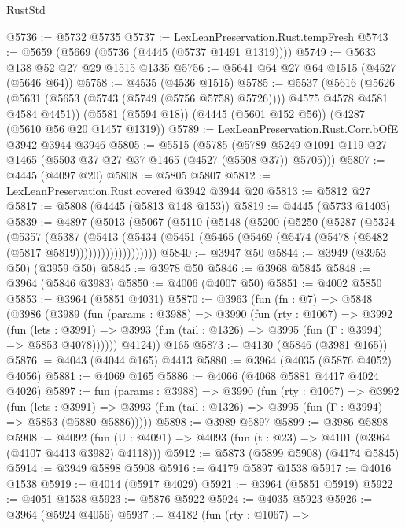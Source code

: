 \begin{lexlean}{RustStd}
\begin{coremodule}
{\begin{coremodule}
{{{{{{{{{{{{{{{{{{{{{{{{{{{{{{{{{{{{{{@5736 := @5732 @5735
@5737 := LexLeanPreservation.Rust.tempFresh
@5743 := @5659 (@5669 (@5736 (@4445 (@5737 @1491 @1319))))
@5749 := @5633 @138 @52 @27 @29 @1515 @1335
@5756 := @5641 @64 @27 @64 @1515 (@4527 (@5646 @64))
@5758 := @4535 (@4536 @1515)
@5785 := @5537
    (@5616
      (@5626 (@5631 (@5653 (@5743 (@5749 (@5756 @5758) @5726)))) @4575 @4578 @4581 @4584 @4451))
    (@5581 (@5594 @18))
    (@4445 (@5601 @152 @56))
    (@4287 (@5610 @56 @20 @1457 @1319))
@5789 := LexLeanPreservation.Rust.Corr.bOfE @3942 @3944 @3946
@5805 := @5515
    (@5785 (@5789 @5249 @1091 @119 @27 @1465 (@5503 @37 @27 @37 @1465 (@4527 (@5508 @37)) @5705)))
@5807 := @4445 (@4097 @20)
@5808 := @5805 @5807
@5812 := LexLeanPreservation.Rust.covered @3942 @3944 @20
@5813 := @5812 @27
@5817 := @5808 (@4445 (@5813 @148 @153))
@5819 := @4445 (@5733 @1403)
@5839 := @4897
    (@5013
      (@5067
        (@5110
          (@5148
            (@5200
              (@5250
                (@5287
                  (@5324
                    (@5357
                      (@5387
                        (@5413
                          (@5434
                            (@5451
                              (@5465 (@5469 (@5474 (@5478 (@5482 (@5817 @5819)))))))))))))))))))
@5840 := @3947 @50
@5844 := @3949 (@3953 @50) (@3959 @50)
@5845 := @3978 @50
@5846 := @3968 @5845
@5848 := @3964 (@5846 @3983)
@5850 := @4006 (@4007 @50)
@5851 := @4002 @5850
@5853 := @3964 (@5851 @4031)
@5870 := @3963
    (fun (fn : @7) =>
    @5848
      (@3986
        (@3989
          (fun (params : @3988) =>
          @3990
            (fun (rty : @1067) =>
            @3992
              (fun (lets : @3991) =>
              @3993 (fun (tail : @1326) => @3995 (fun (Γ : @3994) => @5853 @4078))))))
        @4124))
    @165
@5873 := @4130 (@5846 (@3981 @165))
@5876 := @4043 (@4044 @165) @4413
@5880 := @3964 (@4035 (@5876 @4052) @4056)
@5881 := @4069 @165
@5886 := @4066 (@4068 @5881 @4417 @4024 @4026)
@5897 := fun (params : @3988) =>
  @3990
    (fun (rty : @1067) =>
    @3992
      (fun (lets : @3991) =>
      @3993 (fun (tail : @1326) => @3995 (fun (Γ : @3994) => @5853 (@5880 @5886)))))
@5898 := @3989 @5897
@5899 := @3986 @5898
@5908 := @4092 (fun (U : @4091) => @4093 (fun (t : @23) => @4101 (@3964 (@4107 @4413 @3982) @4118)))
@5912 := @5873 (@5899 @5908) (@4174 @5845)
@5914 := @3949 @5898 @5908
@5916 := @4179 @5897 @1538
@5917 := @4016 @1538
@5919 := @4014 (@5917 @4029)
@5921 := @3964 (@5851 @5919)
@5922 := @4051 @1538
@5923 := @5876 @5922
@5924 := @4035 @5923
@5926 := @3964 (@5924 @4056)
@5937 := @4182
    (fun (rty : @1067) =>
}}}}}}}}}}}}}}}}}}}}}}}}}}}}}}}}}}}}}}
\end{coremodule}}
\end{coremodule}
\end{lexlean}
